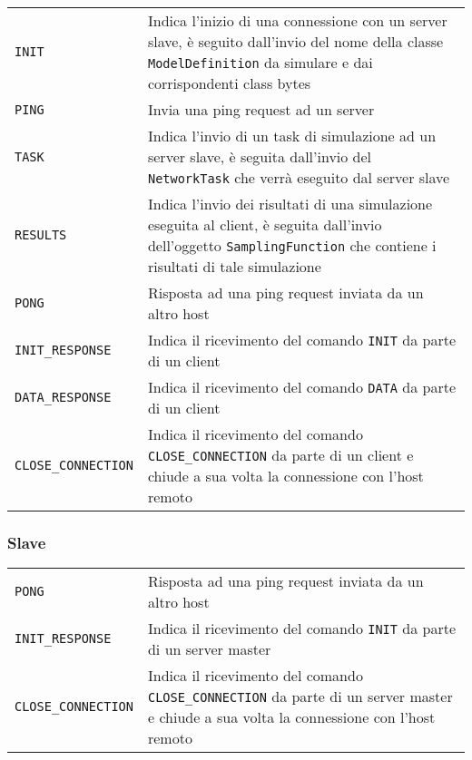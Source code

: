 \begin{table}[H]
    \begin{tabularx}{\linewidth}{ l X }
        \texttt{INIT} & Indica l'inizio di una connessione con un server slave, è seguito dall'invio del nome della classe \texttt{ModelDefinition} da simulare e dai corrispondenti class bytes \\
        \texttt{PING} & Invia una ping request ad un server \\
        \texttt{TASK} & Indica l'invio di un task di simulazione ad un server slave, è seguita dall'invio del \texttt{NetworkTask} che verrà eseguito dal server slave \\
        \texttt{RESULTS} & Indica l'invio dei risultati di una simulazione eseguita al client, è seguita dall'invio dell'oggetto \texttt{SamplingFunction} che contiene i risultati di tale simulazione \\
        \texttt{PONG} & Risposta ad una ping request inviata da un altro host \\
        \texttt{INIT\_RESPONSE} & Indica il ricevimento del comando \texttt{INIT} da parte di un client \\
        \texttt{DATA\_RESPONSE} & Indica il ricevimento del comando \texttt{DATA} da parte di un client\\
        \texttt{CLOSE\_CONNECTION} & Indica il ricevimento del comando \texttt{CLOSE\_CONNECTION} da parte di un client e chiude a sua volta la connessione con l'host remoto \\
    \end{tabularx}
\end{table}

\subsubsection{Slave}

\begin{table}[H]
    \begin{tabularx}{\linewidth}{ l X }
        \texttt{PONG} & Risposta ad una ping request inviata da un altro host \\
        \texttt{INIT\_RESPONSE} & Indica il ricevimento del comando \texttt{INIT} da parte di un server master \\
        \texttt{CLOSE\_CONNECTION} & Indica il ricevimento del comando \texttt{CLOSE\_CONNECTION} da parte di un server master e chiude a sua volta la connessione con l'host remoto \\
    \end{tabularx}
\end{table}

